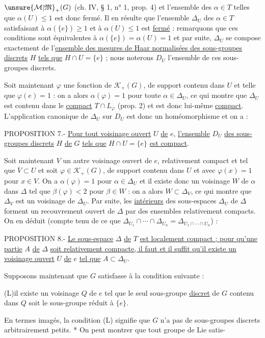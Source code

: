 $\unsure{\mathcal M|\mathfrak M}_+(G)$ (ch. IV, § 1, n° 1, prop. 4) et l'ensemble des $\alpha\in T$ telles que $\alpha(U)\leq 1$ est donc fermé. Il en résulte que l'ensemble $\Delta_U$ des $\alpha\in T$ satisfaisant à $\alpha(\{e\})\geq 1$ et à $\alpha(U)\leq 1$ est \uline{fermé} : remarquons que ces conditions sont équivalentes à $\alpha(\{e\})=\alpha(U)=1$ et par suite, $\Delta_U$ se compose exactement de l'\uline{ensemble des mesures de Haar normalisées des sous-groupes discrets} $H$ \uline{tels que} $H\cap U=\{e\}$ ; nous noterons $D_U$ l'ensemble de ces sous-groupes discrets.

Soit maintenant $\varphi$ une fonction de $\mathcal K_+(G)$, de support contenu dans $U$ et telle que $\varphi(e)=1$ : on a alors $\alpha(\varphi)=1$ pour toute $\alpha\in\Delta_U$, ce qui montre que $\Delta_U$ est contenu dans le \uline{compact} $T\cap L_\varphi$ (prop. 2) et est donc lui-même \uline{compact}. L'application canonique de $\Delta_U$ sur $D_U$ est donc un homéomorphisme et on a :

PROPOSITION 7.- \uline{Pour tout voisinage ouvert} $U$ \uline{de} $e$, \uline{l'ensemble} $D_U$ \uline{des sous-groupes discrets} $H$ \uline{de} $G$ \uline{tels que} $H\cap U=\{e\}$ \uline{est compact}.

Soit maintenant $V$ un autre voisinage ouvert de $e$, relativement compact et tel que $\overline V\subset U$ et soit $\varphi\in\mathcal K_+(G)$, de support contenu dans $U$ et avec $\varphi(x)=1$ pour $x\in V$. On a $\alpha(\varphi)=1$ pour $\alpha\in\Delta_U$ et il existe donc un voisinage $W$ de $\alpha$ dans $\Delta$ tel que $\beta(\varphi)<2$ pour $\beta\in W$ : on a alors $W\subset\Delta_V$, ce qui montre que $\Delta_V$ est un voisinage de $\Delta_U$. Par suite, les \uline{intérieurs} des sous-espaces $\Delta_U$ de $\Delta$ forment un recouvrement ouvert de $\Delta$ par des ensembles relativement compacts. On en déduit (compte tenu de ce que $\Delta_{U_1}\cap\cdots\cap\Delta_{U_n}=\Delta_{U_1\cap\cdots\cap U_n}$) :

PROPOSITION 8.- \uline{Le sous-espace} $\Delta$ \uline{de} $T$ \uline{est localement compact ; pour qu'une partie} $A$ \uline{de} $\Delta$ \uline{soit relativement compacte, il faut et il suffit qu'il existe un voisinage ouvert} $U$ \uline{de} $e$ \uline{tel que} $A\subset\Delta_U$.

Supposons maintenant que $G$ satisfasse à la condition suivante :

(L)\qquad il existe un voisinage $Q$ de $e$ tel que le seul sous-groupe \uline{discret} de $G$ contenu dans $Q$ soit le sous-groupe réduit à $\{e\}$.

En termes imagés, la condition (L) signifie que $G$ n'a pas de sous-groupes discrets arbitrairement petits. * On peut montrer que tout groupe de Lie satis-
